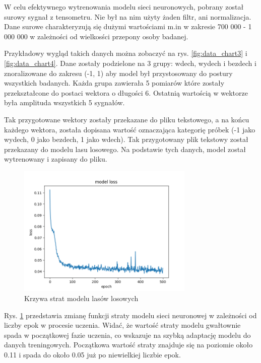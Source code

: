 \documentclass{article}
\begin{document}
W celu efektywnego wytrenowania modelu sieci neuronowych, pobrany został surowy sygnał z tensometru. Nie był na nim użyty żaden filtr, ani normalizacja. Dane surowe charakteryzują się dużymi wartościami m.in w zakresie 700 000 - 1 000 000 w zależności od wielkosści przepony osoby badanej. 

Przykładowy wygląd takich danych można zobaczyć na rys. \ref{fig:data_chart3} i \ref{fig:data_chart4}. Dane zostały podzielone na 3 grupy: wdech, wydech i bezdech i znoralizowane do zakresu (-1, 1) aby model był przystosowany do postury wszystkich badanych. Każda grupa zawierała 5 pomiarów które zostały przekształcone do postaci wektora o długości 6. Ostatnią wartością w wektorze była amplituda wszystkich 5 sygnałów. 

Tak przygotowane wektory zostały przekazane do pliku tekstowego, a na końcu każdego wektora, została dopisana wartość oznaczająca kategorię próbek (-1 jako wydech, 0 jako bezdech, 1 jako wdech). Tak przygotowany plik tekstowy został przekazany do modelu lasu losowego. Na podstawie tych danych, model został wytrenowany i zapisany do pliku.

\begin{figure}[H]
    \centering
    \includegraphics[width=0.75\textwidth]{epoch_loss_forest.png}
    \caption{Krzywa strat modelu lasów losowych}
    \label{fig:data_chart2}
\end{figure}

Rys. \ref{fig:data_chart2} przedstawia zmianę funkcji straty modelu sieci neuronowej w zależności od liczby epok w procesie uczenia. Widać, że wartość straty modelu gwałtownie spada w początkowej fazie uczenia, co wskazuje na szybką adaptację modelu do danych treningowych. Początkowa wartość straty znajduje się na poziomie około 0.11 i spada do około 0.05 już po niewielkiej liczbie epok.
\end{document}
